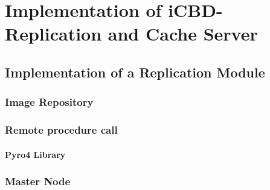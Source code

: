 \chapter{Implementation of iCBD-Replication and Cache Server}
\label{cha:replication}


\section{Implementation of a Replication Module}
\label{sec:replication_impl}


\subsection{Image Repository}
\label{sub:rep_image_repo}

\subsection{Remote procedure call}
\label{sub:rep_rpcs}

\subsubsection{Pyro4 Library}
\label{subsub:rep_pyro4}


\subsection{Master Node}
\label{sub:rep_master_node}

